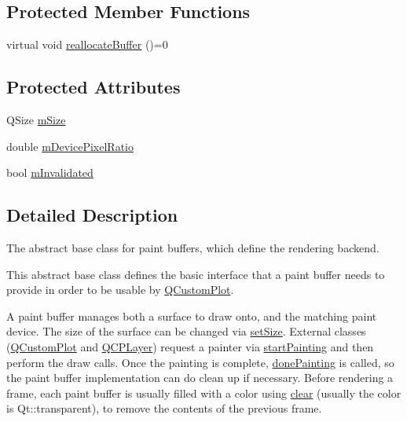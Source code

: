 \subsection*{Protected Member Functions}
\begin{DoxyCompactItemize}
\item 
virtual void \mbox{\hyperlink{class_q_c_p_abstract_paint_buffer_aee7506a52bd7e5a07c2af27935eb13e7}{reallocate\+Buffer}} ()=0
\end{DoxyCompactItemize}
\subsection*{Protected Attributes}
\begin{DoxyCompactItemize}
\item 
Q\+Size \mbox{\hyperlink{class_q_c_p_abstract_paint_buffer_ae246c426222bfa18d5e8797fab73e3ce}{m\+Size}}
\item 
double \mbox{\hyperlink{class_q_c_p_abstract_paint_buffer_a33c1fd784478441fcff9ebf3d69af5b2}{m\+Device\+Pixel\+Ratio}}
\item 
bool \mbox{\hyperlink{class_q_c_p_abstract_paint_buffer_a3bc49cc9cf9daaca3a60977f010c08c9}{m\+Invalidated}}
\end{DoxyCompactItemize}


\subsection{Detailed Description}
The abstract base class for paint buffers, which define the rendering backend. 

This abstract base class defines the basic interface that a paint buffer needs to provide in order to be usable by \mbox{\hyperlink{class_q_custom_plot}{Q\+Custom\+Plot}}.

A paint buffer manages both a surface to draw onto, and the matching paint device. The size of the surface can be changed via \mbox{\hyperlink{class_q_c_p_abstract_paint_buffer_a8b68c3cd36533f1a4a23b5ce8cd66f01}{set\+Size}}. External classes (\mbox{\hyperlink{class_q_custom_plot}{Q\+Custom\+Plot}} and \mbox{\hyperlink{class_q_c_p_layer}{Q\+C\+P\+Layer}}) request a painter via \mbox{\hyperlink{class_q_c_p_abstract_paint_buffer_a9e9f29b19c033cf02fb96f1a148463f3}{start\+Painting}} and then perform the draw calls. Once the painting is complete, \mbox{\hyperlink{class_q_c_p_abstract_paint_buffer_a41b0dc6e7744f19fae09f8532c207dc1}{done\+Painting}} is called, so the paint buffer implementation can do clean up if necessary. Before rendering a frame, each paint buffer is usually filled with a color using \mbox{\hyperlink{class_q_c_p_abstract_paint_buffer_a9e253f4541dfc01992b77e8830bd7722}{clear}} (usually the color is {\ttfamily Qt\+::transparent}), to remove the contents of the previous frame.

